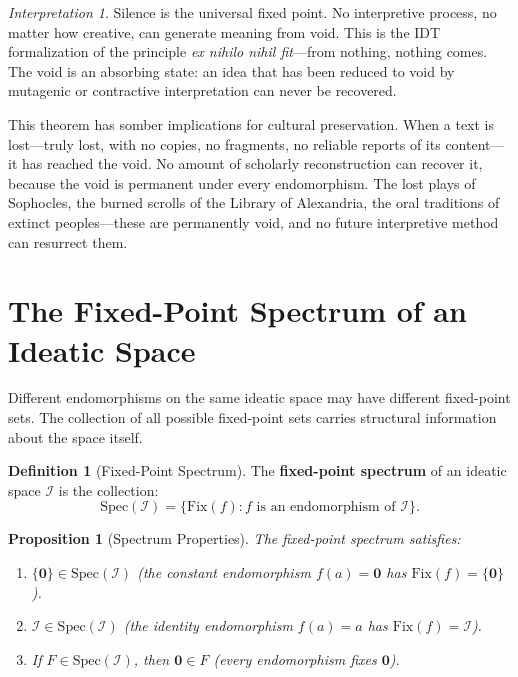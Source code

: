 \documentclass[11pt,openany]{book}
\theoremstyle{definition}
\newtheorem{definition}[axiom]{Definition}
\theoremstyle{plain}
\newtheorem{proposition}[axiom]{Proposition}
\theoremstyle{remark}
\newtheorem{interpretation}[axiom]{Interpretation}
\newcommand{\IS}{\mathcal{I}}               %
\newcommand{\void}{\mathbf{0}}              %
\begin{document}
\begin{interpretation}
Silence is the universal fixed point. No interpretive process, no matter how creative, can generate meaning from void. This is the IDT formalization of the principle \textit{ex nihilo nihil fit}---from nothing, nothing comes. The void is an absorbing state: an idea that has been reduced to void by mutagenic or contractive interpretation can never be recovered.

This theorem has somber implications for cultural preservation. When a text is lost---truly lost, with no copies, no fragments, no reliable reports of its content---it has reached the void. No amount of scholarly reconstruction can recover it, because the void is permanent under every endomorphism. The lost plays of Sophocles, the burned scrolls of the Library of Alexandria, the oral traditions of extinct peoples---these are permanently void, and no future interpretive method can resurrect them.
\end{interpretation}

\section{The Fixed-Point Spectrum of an Ideatic Space}

Different endomorphisms on the same ideatic space may have different fixed-point sets. The collection of all possible fixed-point sets carries structural information about the space itself.

\begin{definition}[Fixed-Point Spectrum]
The \textbf{fixed-point spectrum} of an ideatic space $\IS$ is the collection:
\[
\mathrm{Spec}(\IS) = \{\mathrm{Fix}(f) : f \text{ is an endomorphism of } \IS\}.
\]
\end{definition}

\begin{proposition}[Spectrum Properties]
The fixed-point spectrum satisfies:
\begin{enumerate}
\item $\{\void\} \in \mathrm{Spec}(\IS)$ (the constant endomorphism $f(a) = \void$ has $\mathrm{Fix}(f) = \{\void\}$).
\item $\IS \in \mathrm{Spec}(\IS)$ (the identity endomorphism $f(a) = a$ has $\mathrm{Fix}(f) = \IS$).
\item If $F \in \mathrm{Spec}(\IS)$, then $\void \in F$ (every endomorphism fixes $\void$).
\end{enumerate}
\end{proposition}
\end{document}
